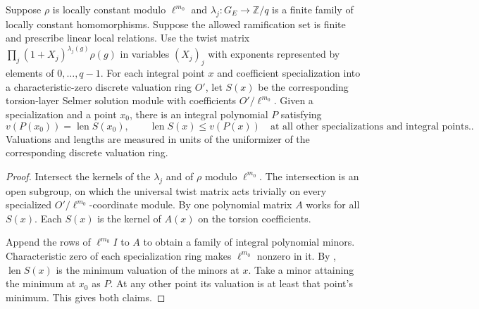 \begin{lemma}
\label{lem:c-selmer-sharp-polynomial}
\emitthmsource
Suppose $\rho$ is locally constant modulo $\ell^{m_0}$ and $\lambda_j:G_E\to\mathbb Z/q$ is a finite family of locally constant homomorphisms.
Suppose the allowed ramification set is finite and prescribe linear local relations.
Use the twist matrix $\prod_j(1+X_j)^{\lambda_j(g)}\rho(g)$ in variables $(X_j)_j$ with exponents represented by elements of $0,\ldots,q-1$.
For each integral point $x$ and coefficient specialization into a characteristic-zero discrete valuation ring $O'$, let $S(x)$ be the corresponding torsion-layer Selmer solution module with coefficients $O'/\ell^{m_0}$.
Given a specialization and a point $x_0$, there is an integral polynomial $P$ satisfying
\[
 v(P(x_0))=\operatorname{len}S(x_0),
 \qquad
 \operatorname{len}S(x)\le v(P(x))\quad\text{at all other specializations and integral points.}.
\]
Valuations and lengths are measured in units of the uniformizer of the corresponding discrete valuation ring.
\end{lemma}
\begin{proof}
Intersect the kernels of the $\lambda_j$ and of $\rho$ modulo $\ell^{m_0}$.
The intersection is an open subgroup, on which the universal twist matrix acts trivially on every specialized $O'/\ell^{m_0}$-coordinate module.
By  one polynomial matrix $A$ works for all $S(x)$. Each $S(x)$ is the kernel of $A(x)$ on the torsion coefficients.

Append the rows of $\ell^{m_0}I$ to $A$ to obtain a family of integral polynomial minors.
Characteristic zero of each specialization ring makes $\ell^{m_0}$ nonzero in it.
By , $\operatorname{len}S(x)$ is the minimum valuation of the minors at $x$.
Take a minor attaining the minimum at $x_0$ as $P$. At any other point its valuation is at least that point's minimum. This gives both claims.
\end{proof}

